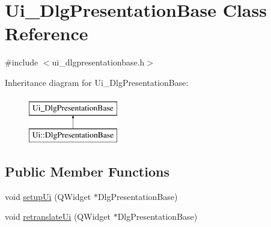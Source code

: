 \hypertarget{classUi__DlgPresentationBase}{\section{Ui\+\_\+\+Dlg\+Presentation\+Base Class Reference}
\label{classUi__DlgPresentationBase}
}


{\ttfamily \#include $<$ui\+\_\+dlgpresentationbase.\+h$>$}

Inheritance diagram for Ui\+\_\+\+Dlg\+Presentation\+Base\+:\begin{figure}[H]
\begin{center}
\leavevmode
\includegraphics[height=2.000000cm]{classUi__DlgPresentationBase}
\end{center}
\end{figure}
\subsection*{Public Member Functions}
\begin{DoxyCompactItemize}
\item 
void \hyperlink{classUi__DlgPresentationBase_a08f712538ec0fc692a48271f8ae38bc5}{setup\+Ui} (Q\+Widget $\ast$Dlg\+Presentation\+Base)
\item 
void \hyperlink{classUi__DlgPresentationBase_a82ecd8c43e941a0193e28a3c7f52e3bc}{retranslate\+Ui} (Q\+Widget $\ast$Dlg\+Presentation\+Base)
\end{DoxyCompactItemize}
